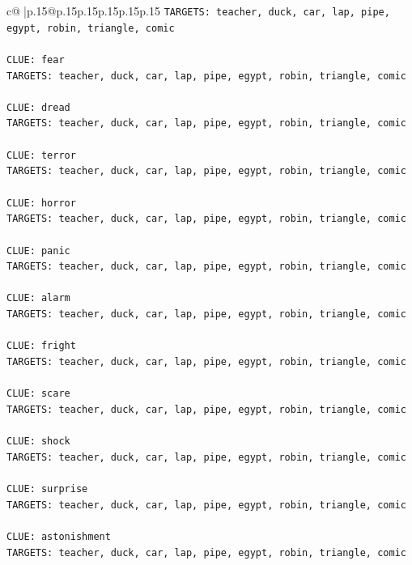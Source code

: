 \documentclass{article}
\begin{document}
{\begin{supertabular}{c@{$\;$}|p{.15\linewidth}@{}p{.15\linewidth}p{.15\linewidth}p{.15\linewidth}p{.15\linewidth}p{.15\linewidth}}
{{{\texttt{TARGETS: teacher, duck, car, lap, pipe, egypt, robin, triangle, comic} \\
\\ 
\texttt{CLUE: fear} \\
\texttt{TARGETS: teacher, duck, car, lap, pipe, egypt, robin, triangle, comic} \\
\\ 
\texttt{CLUE: dread} \\
\texttt{TARGETS: teacher, duck, car, lap, pipe, egypt, robin, triangle, comic} \\
\\ 
\texttt{CLUE: terror} \\
\texttt{TARGETS: teacher, duck, car, lap, pipe, egypt, robin, triangle, comic} \\
\\ 
\texttt{CLUE: horror} \\
\texttt{TARGETS: teacher, duck, car, lap, pipe, egypt, robin, triangle, comic} \\
\\ 
\texttt{CLUE: panic} \\
\texttt{TARGETS: teacher, duck, car, lap, pipe, egypt, robin, triangle, comic} \\
\\ 
\texttt{CLUE: alarm} \\
\texttt{TARGETS: teacher, duck, car, lap, pipe, egypt, robin, triangle, comic} \\
\\ 
\texttt{CLUE: fright} \\
\texttt{TARGETS: teacher, duck, car, lap, pipe, egypt, robin, triangle, comic} \\
\\ 
\texttt{CLUE: scare} \\
\texttt{TARGETS: teacher, duck, car, lap, pipe, egypt, robin, triangle, comic} \\
\\ 
\texttt{CLUE: shock} \\
\texttt{TARGETS: teacher, duck, car, lap, pipe, egypt, robin, triangle, comic} \\
\\ 
\texttt{CLUE: surprise} \\
\texttt{TARGETS: teacher, duck, car, lap, pipe, egypt, robin, triangle, comic} \\
\\ 
\texttt{CLUE: astonishment} \\
\texttt{TARGETS: teacher, duck, car, lap, pipe, egypt, robin, triangle, comic} \\
}}}
\end{supertabular}}
\end{document}

